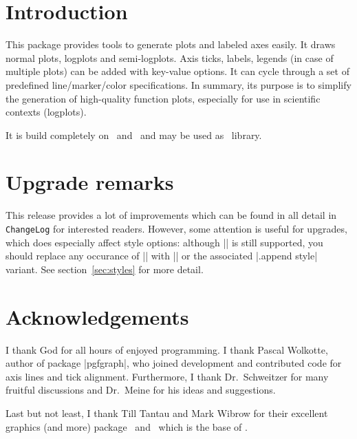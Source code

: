 \section{Introduction}
This package provides tools to generate plots and labeled axes easily. It draws normal plots, logplots and semi-logplots. Axis ticks, labels, legends (in case of multiple plots) can be added with key-value options. It can cycle through a set of predefined line/marker/color specifications. In summary, its purpose is to simplify the generation of high-quality function plots, especially for use in scientific contexts (logplots).

It is build completely on \Tikz\ and \PGF\ and may be used as \Tikz\ library. 

\section{Upgrade remarks}
This release provides a lot of improvements which can be found in all detail in \texttt{ChangeLog} for interested readers. However, some attention is useful for upgrades, which does especially affect style options: although |\tikzstyle| is still supported, you should replace any occurance of |\tikzstyle| with || or the associated |.append style| variant. See section~\ref{sec:styles} for more detail.

\section{Acknowledgements}
I thank God for all hours of enjoyed programming. I thank Pascal Wolkotte, author of package |pgfgraph|, who joined development and contributed code for axis lines and tick alignment. Furthermore, I thank Dr.~Schweitzer for many fruitful discussions and Dr.~Meine for his ideas and suggestions.

Last but not least, I thank Till Tantau and Mark Wibrow for their excellent graphics (and more) package \PGF\ and \Tikz\ which is the base of \PGFPlots.


%
%
%
%

\printindex




